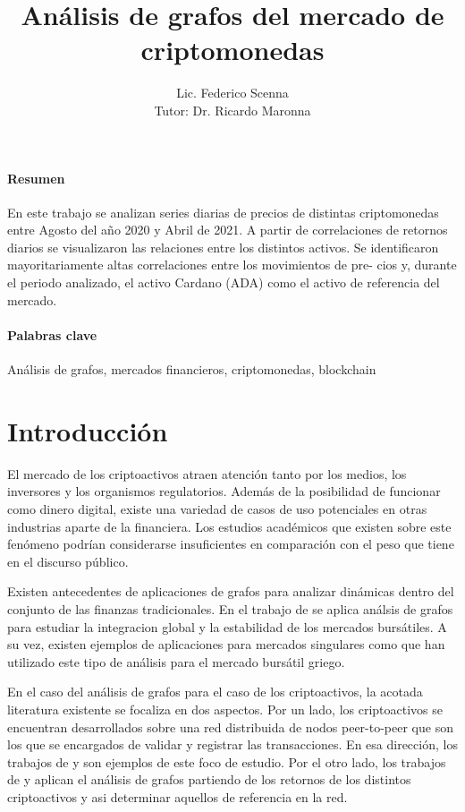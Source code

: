 \documentclass[runningheads,a4paper,10pt]{etc/llncs}
\title{Análisis de grafos del mercado de criptomonedas}
\author{Lic. Federico Scenna\\ [1cm] {\small Tutor: Dr. Ricardo Maronna}}
\institute{ Maestría en Exploración de Datos y Descubrimiento del Conocimiento \\
Facultad de Ciencias Exactas y Naturales\\ Universidad de Buenos Aires\\
\mailsa
}
\let\stdsection\section
\renewcommand\section{\newpage\stdsection}
\begin{document}
\let\oldaddcontentsline\addcontentsline
\def\addcontentsline#1#2#3{}
\maketitle
\def\addcontentsline#1#2#3{\oldaddcontentsline{#1}{#2}{#3}}

\newpage

\paragraph{Resumen} En este trabajo se analizan series diarias de precios de distintas criptomonedas entre Agosto del año 2020 y Abril de 2021. A partir de correlaciones
de retornos diarios se visualizaron las relaciones entre los distintos activos. Se
identificaron mayoritariamente altas correlaciones entre los movimientos de pre-
cios y, durante el periodo analizado, el activo Cardano (ADA) como el activo de
referencia del mercado.

\paragraph{Palabras clave} Análisis de grafos, mercados financieros, criptomonedas, blockchain

\tableofcontents

\newpage
\section{Introducción}

El mercado de los criptoactivos atraen atención tanto por los medios, los inversores y los organismos regulatorios. Además de la posibilidad de funcionar como dinero digital, existe una variedad de casos de uso potenciales en otras industrias aparte de la financiera. Los estudios académicos que existen sobre este fenómeno podrían considerarse insuficientes en comparación con el peso que tiene en el discurso público. 

Existen antecedentes de aplicaciones de grafos para analizar dinámicas dentro del conjunto de las finanzas tradicionales. En el trabajo de \cite{towards} se aplica análsis de grafos para estudiar la integracion global y la estabilidad de los mercados bursátiles. A su vez, existen ejemplos de aplicaciones para mercados singulares como \cite{grekmarket}  que han utilizado este tipo de análisis para el mercado bursátil griego. 

En el caso del análisis de grafos para el caso de los criptoactivos, la acotada literatura existente se focaliza en dos aspectos. Por un lado, los criptoactivos se encuentran desarrollados sobre una red distribuida de nodos peer-to-peer que son los que se encargados de validar y registrar las transacciones. En esa dirección, los trabajos de \cite{btc-blockchain} y \cite{btc-btccash} son ejemplos de este foco de estudio. Por el otro lado, los trabajos de  \cite{cryptocurrency_rjc} y \cite{cryptonetwork} aplican el análisis de grafos partiendo de los retornos de los distintos criptoactivos y asi determinar aquellos de referencia en la red. 
\end{document}
